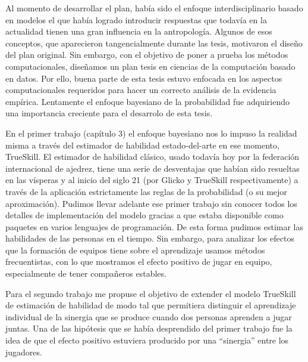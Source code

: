 \documentclass[a4paper,11pt]{book}
\theoremstyle{definition}
\begin{document}

Al momento de desarrollar el plan, había sido el enfoque interdisciplinario basado en modelos el que había logrado introducir respuestas que todavía en la actualidad tienen una gran influencia en la antropología.
%
%
Algunos de esos conceptos, que aparecieron tangencialmente durante las tesis, motivaron el diseño del plan original.
%
Sin embargo, con el objetivo de poner a prueba los métodos computacionales, diseñamos un plan tesis en ciencias de la computación basado en datos.
%
Por ello, buena parte de esta tesis estuvo enfocada en los aspectos computacionales requeridos para hacer un correcto análisis de la evidencia empírica.
%
Lentamente el enfoque bayesiano de la probabilidad fue adquiriendo una importancia creciente para el desarrolo de esta tesis.


En el primer trabajo (capítulo 3) el enfoque bayesiano nos lo impuso la realidad misma a través del estimador de habilidad estado-del-arte en ese momento, TrueSkill.
%
El estimador de habilidad clásico, usado todavía hoy por la federación internacional de ajedrez, tiene una serie de desventajas que habían sido resueltas en las vísperas y al inicio del siglo 21 (por Glicko y TrueSkill respectivamente) a través de la aplicación estrictamente las reglas de la probabilidad (o su mejor aproximación).
%
Pudimos llevar adelante ese primer trabajo sin conocer todos los detalles de implementación del modelo gracias a que estaba disponible como paquetes en varios lenguajes de programación.
%
De esta forma pudimos estimar las habilidades de las personas en el tiempo.
%
Sin embargo, para analizar los efectos que la formación de equipos tiene sobre el aprendizaje usamos métodos frecuentistas, con lo que mostramos el efecto positivo de jugar en equipo, especialmente de tener compañeros estables.


Para el segundo trabajo me propuse el objetivo de extender el modelo TrueSkill de estimación de habilidad de modo tal que permitiera distinguir el aprendizaje individual de la sinergia que se produce cuando dos personas aprenden a jugar juntas.
%
Una de las hipótesis que se había desprendido del primer trabajo fue la idea de que el efecto positivo estuviera producido por una ``sinergia'' entre los jugadores.
%
\end{document}
